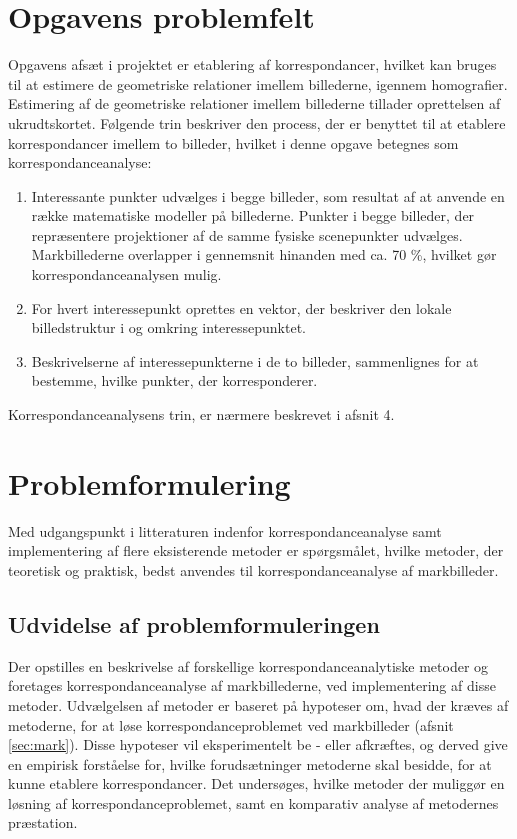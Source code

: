 \section{Opgavens problemfelt} \label{subsec:felt}
Opgavens afsæt i projektet er etablering af korrespondancer, hvilket kan bruges til at estimere de geometriske relationer imellem billederne, igennem homografier. Estimering af de geometriske relationer imellem billederne tillader oprettelsen af ukrudtskortet. Følgende trin beskriver den process, der er benyttet til at etablere korrespondancer imellem to billeder, hvilket i denne opgave betegnes som korrespondanceanalyse:
\begin{enumerate}
\item{Interessante punkter udvælges i begge billeder, som resultat af at anvende en række matematiske modeller på billederne. Punkter i begge billeder, der repræsentere projektioner af de samme fysiske scenepunkter udvælges. Markbillederne overlapper i gennemsnit hinanden med ca. 70 \%, hvilket gør korrespondanceanalysen mulig.}
\item{For hvert interessepunkt oprettes en vektor, der beskriver den lokale billedstruktur i og omkring interessepunktet.}
\item{Beskrivelserne af interessepunkterne i de to billeder, sammenlignes for at bestemme, hvilke punkter, der korresponderer.}
\end{enumerate}
Korrespondanceanalysens trin, er nærmere beskrevet i afsnit 4.
\section{Problemformulering} \label{subsec:form}
Med udgangspunkt i litteraturen indenfor
korrespondanceanalyse samt implementering af
flere eksisterende metoder er spørgsmålet, hvilke metoder, der teoretisk og praktisk, bedst anvendes til korrespondanceanalyse af markbilleder.
\subsection{Udvidelse af problemformuleringen}
Der opstilles en beskrivelse af forskellige korrespondanceanalytiske metoder og foretages korrespondanceanalyse af markbillederne, ved implementering af disse metoder. Udvælgelsen af metoder er baseret på hypoteser om, hvad der kræves af metoderne, for at løse korrespondanceproblemet ved markbilleder (afsnit \ref{sec:mark}). Disse hypoteser vil eksperimentelt be - eller afkræftes, og derved give en empirisk forståelse for, hvilke forudsætninger metoderne skal besidde, for at kunne etablere korrespondancer. 
Det undersøges, hvilke metoder der muliggør en løsning af korrespondanceproblemet, samt en komparativ analyse af metodernes præstation.
